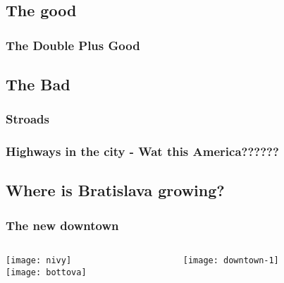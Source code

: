 \subsection{The good}

\begin{frame}
	\frametitle{The Double Plus Good}
	\centering
\end{frame}

\subsection{The Bad}

\begin{frame}
	\centering
	\frametitle{Stroads}
\end{frame}

\begin{frame}
	\frametitle{Highways in the city - Wat this America??????}
\end{frame}

\subsection{Where is Bratislava growing?}

\begin{frame}
	\frametitle{The new downtown}
	\begin{columns}
		\begin{column}{.48\textwidth}
			\texttt{[image: nivy]}\\
			\texttt{[image: bottova]}
		\end{column}
		\begin{column}{.48\textwidth}
			\texttt{[image: downtown-1]}
		\end{column}
	\end{columns}
\end{frame}

